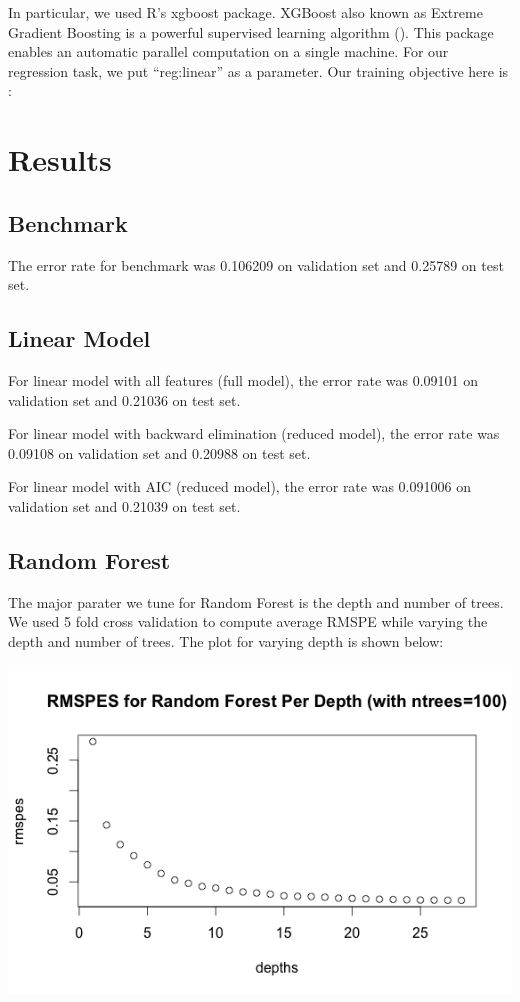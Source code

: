 \documentclass[letterpaper,twocolumn,10pt]{article}
\begin{document}
In particular, we used R's xgboost package. XGBoost also known as Extreme Gradient Boosting is a powerful supervised learning algorithm (). This package enables an automatic parallel computation on a single machine. For our regression task, we put ``reg:linear'' as a parameter. Our training objective here is :




\section{Results}
\subsection{Benchmark}
The error rate for benchmark was 0.106209 on validation set and 0.25789 on test set.

\subsection{Linear Model}

For linear model with all features (full model), the error rate was 0.09101 on validation set and 0.21036 on test set.

For linear model with backward elimination (reduced model), the error rate was 0.09108 on validation set and 0.20988 on test set.

For linear model with AIC (reduced model), the error rate was 0.091006 on validation set and 0.21039 on test set.

\subsection{Random Forest}
The major parater we tune for Random Forest is the depth and number of trees. We used 5 fold cross validation to compute average RMSPE while varying the depth and number of trees. The plot for varying depth is shown below:

\includegraphics[scale=0.35]{img/RandomForestPerDepth.png}
\end{document}
